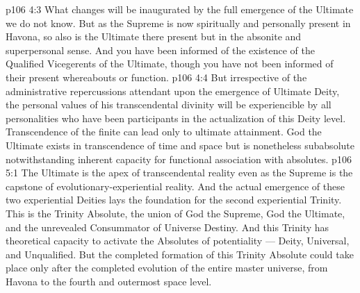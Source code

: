 \vs p106 4:3 What changes will be inaugurated by the full emergence of the Ultimate we do not know. But as the Supreme is now spiritually and personally present in Havona, so also is the Ultimate there present but in the absonite and superpersonal sense. And you have been informed of the existence of the Qualified Vicegerents of the Ultimate, though you have not been informed of their present whereabouts or function.
\vs p106 4:4 But irrespective of the administrative repercussions attendant upon the emergence of Ultimate Deity, the personal values of his transcendental divinity will be experiencible by all personalities who have been participants in the actualization of this Deity level. Transcendence of the finite can lead only to ultimate attainment. God the Ultimate exists in transcendence of time and space but is nonetheless subabsolute notwithstanding inherent capacity for functional association with absolutes.
\vs p106 5:1 The Ultimate is the apex of transcendental reality even as the Supreme is the capstone of evolutionary\hyp{}experiential reality. And the actual emergence of these two experiential Deities lays the foundation for the second experiential Trinity. This is the Trinity Absolute, the union of God the Supreme, God the Ultimate, and the unrevealed Consummator of Universe Destiny. And this Trinity has theoretical capacity to activate the Absolutes of potentiality --- Deity, Universal, and Unqualified. But the completed formation of this Trinity Absolute could take place only after the completed evolution of the entire master universe, from Havona to the fourth and outermost space level.
